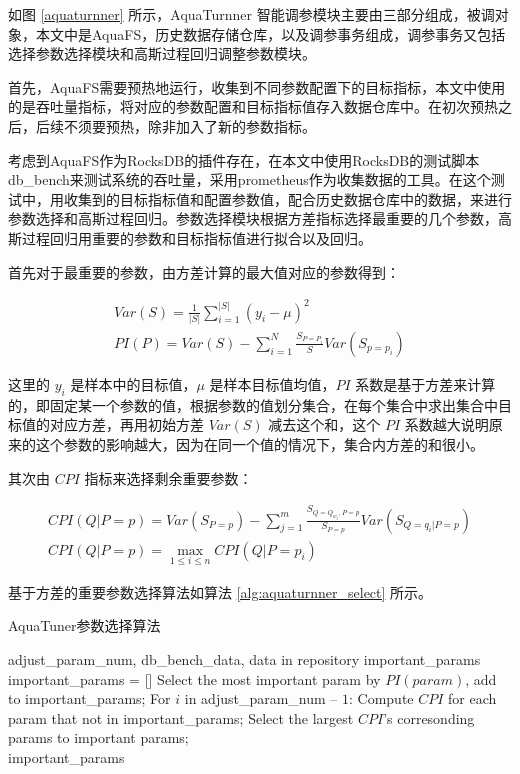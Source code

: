 如图 \ref{aquaturnner} 所示，AquaTurnner 智能调参模块主要由三部分组成，被调对象，本文中是AquaFS，历史数据存储仓库，以及调参事务组成，调参事务又包括选择参数选择模块和高斯过程回归调整参数模块。

首先，AquaFS需要预热地运行，收集到不同参数配置下的目标指标，本文中使用的是吞吐量指标，将对应的参数配置和目标指标值存入数据仓库中。在初次预热之后，后续不须要预热，除非加入了新的参数指标。

考虑到AquaFS作为RocksDB的插件存在，在本文中使用RocksDB的测试脚本db\_bench来测试系统的吞吐量，采用prometheus作为收集数据的工具。在这个测试中，用收集到的目标指标值和配置参数值，配合历史数据仓库中的数据，来进行参数选择和高斯过程回归。参数选择模块根据方差指标选择最重要的几个参数，高斯过程回归用重要的参数和目标指标值进行拟合以及回归。

首先对于最重要的参数，由方差计算的最大值对应的参数得到：

\begin{equation}
  \label{eq:var}
  \begin{aligned}
    Var(S)=\frac{1}{\lvert S\rvert}\sum_{i=1}^{\lvert S\rvert}(y_i-\mu)^2 \\
    PI(P)=Var(S)-\sum_{i=1}^{N}\frac{S_{P=P_i}}{S}Var(S_{p=p_i})
  \end{aligned}
\end{equation}

这里的 $y_i$ 是样本中的目标值，$\mu$ 是样本目标值均值，$PI$ 系数是基于方差来计算的，即固定某一个参数的值，根据参数的值划分集合，在每个集合中求出集合中目标值的对应方差，再用初始方差 $Var(S)$ 减去这个和，这个 $PI$ 系数越大说明原来的这个参数的影响越大，因为在同一个值的情况下，集合内方差的和很小。

其次由 $CPI$ 指标来选择剩余重要参数：

\begin{equation}
  \label{eq:cpi}
  \begin{aligned}
    CPI(Q|P=p) = Var(S_{P=p})-\sum_{j=1}^{m}\frac{S_{Q=Q_{w_j},P=p}}{S_{P=p}}Var(S_{Q=q_i|P=p})\\
    CPI(Q|P=p) = \max_{1\le i\le n}CPI(Q|P=p_i)
  \end{aligned}
\end{equation}

基于方差的重要参数选择算法如算法 \ref{alg:aquaturnner_select} 所示。

\begin{algorithm}[htb]
  \caption{ AquaTuner参数选择算法 }
  \label{alg:aquaturnner_select}
  \begin{algorithmic}[1]
    \Require
      adjust\_param\_num, db\_bench\_data, data in repository
    \Ensure
      important\_params
    \State important\_params = []
    \State Select the most important param by $PI(param)$, add to important\_params;
    \State For $i$ in adjust\_param\_num $–$ $1$:
    \State \qquad Compute $CPI$ for each param that not in important\_params;
    \State \qquad Select the largest $CPI$’s corresonding params to important params; \\
    \Return important\_params
  \end{algorithmic}
\end{algorithm}


